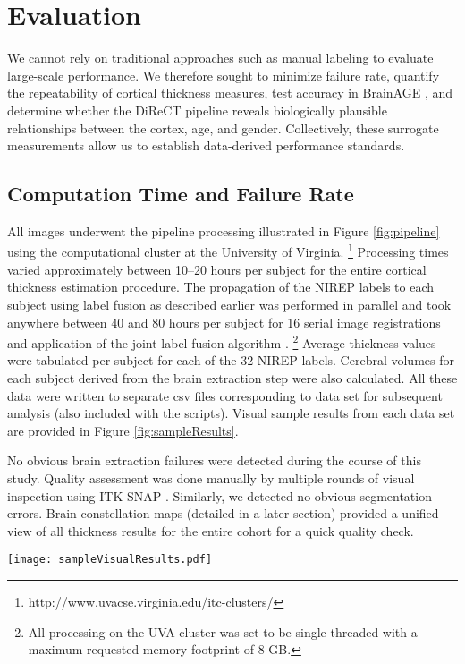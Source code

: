 \section{Evaluation}
We cannot rely on traditional approaches such as manual
labeling to evaluate large-scale performance.  We therefore sought to
minimize failure rate, quantify the repeatability of cortical
thickness measures, test accuracy in BrainAGE \citep{franke2010}, and
determine whether the DiReCT pipeline reveals biologically plausible relationships
between the cortex, age, and gender.  Collectively, these surrogate
measurements allow us to establish data-derived performance standards.

\subsection{Computation Time and Failure Rate}
All images underwent the pipeline processing illustrated in Figure 
\ref{fig:pipeline} using the computational cluster at the University 
of Virginia.%
\footnote{
http://www.uvacse.virginia.edu/itc-clusters/
}  
Processing times varied approximately between 10--20 hours per subject
for the entire cortical thickness estimation procedure.  The propagation of the
NIREP labels to each subject using label fusion as described earlier
was performed in parallel and took anywhere between 40 and 80 hours per 
subject for 16 serial image registrations and application of the joint label fusion algorithm \citep{wang2013}.%
\footnote{
All processing on the UVA cluster was set to be single-threaded with a maximum requested memory footprint of 8 GB.  
}  
Average thickness values were tabulated per subject for each of the
32 NIREP labels.  Cerebral volumes for each subject derived from the brain 
extraction step were also calculated.  All these data were written to separate csv
files corresponding to data set for subsequent 
analysis (also included with the scripts).  Visual sample results from each data set are provided in 
Figure \ref{fig:sampleResults}.

No obvious brain extraction failures  were detected during the course of this study.  
Quality assessment was done manually by multiple rounds of visual inspection using 
ITK-SNAP \cite{yushkevich2006}.  Similarly, we detected no obvious segmentation errors.  Brain constellation maps (detailed in a later section)
provided a unified view of all thickness results for the entire cohort for
a quick quality check.

\begin{figure*}[htb]
  \begin{center}
  \texttt{[image: sampleVisualResults.pdf]}
  \caption{Sample results from each of the four data sets showing the N4 bias
  corrected images, 4-tissue segmentation, cortical thickness, and 
  joint fusion label maps.}
  \label{fig:sampleResults}
  \end{center}
\end{figure*}
  
